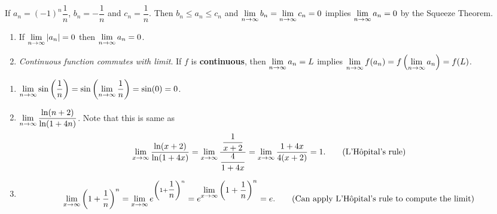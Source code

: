 \begin{ex}
    If $a_n = (-1)^n \dfrac{1}{n}$, $b_n = -\dfrac{1}{n}$ and $c_n = \dfrac{1}{n}$. Then $b_n \leq a_n \leq c_n$ and $\displaystyle\lim_{n \to \infty} b_n = \displaystyle\lim_{n \to \infty} c_n = 0$ implies $\displaystyle\lim_{n \to \infty} a_n = 0$ by the Squeeze Theorem.
\end{ex}
\begin{thm}\leavevmode
    \begin{enumerate}
        \item If $\displaystyle\lim_{n \to \infty} |a_n| = 0$ then $\displaystyle\lim_{n \to \infty} a_n =0$.

        \item \textit{Continuous function commutes with limit}. If $f$ is \textbf{continuous}, then  $\displaystyle\lim_{n \to \infty} a_n = L$ implies $\displaystyle\lim_{n \to \infty} f(a_n) = f \left(\displaystyle\lim_{n \to \infty} a_n\right)= f(L)$.
    \end{enumerate}
\end{thm}

\begin{ex}
    \begin{enumerate}
        \item $\displaystyle\lim_{n \to \infty} \sin\left(\dfrac{1}{n}\right) = \sin\left(\lim_{n \to \infty} \dfrac{1}{n}\right) = \sin(0) = 0$.

        \item $\displaystyle\lim_{n \to \infty} \dfrac{\ln(n+2)}{\ln(1+4n)}$. Note that this is same as  
        \begin{align*}
            \displaystyle\lim_{x \to \infty} \dfrac{\ln(x+2)}{\ln(1+4x)} = \displaystyle\lim_{x \to \infty} \dfrac{\dfrac{1}{x+2}}{\dfrac{4}{1+4x}} = \displaystyle\lim_{x \to \infty} \dfrac{1+4x}{4(x+2)} = 1.  \tag{L'H\^opital's rule}
        \end{align*}

        \item \begin{align*}
            \displaystyle\lim_{x \to \infty} \left(1 + \dfrac{1}{n}\right)^n = \displaystyle\lim_{x \to \infty} e^{\left(1 + \dfrac{1}{n}\right)^n} = e^{\displaystyle\lim_{x \to \infty} \left(1 + \dfrac{1}{n}\right)^n} = e.  \tag{Can apply L'H\^opital's rule to compute the limit}
        \end{align*}
    \end{enumerate}
\end{ex}


